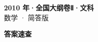\documentclass[zihao=-4, a4paper]{ctexart}
\begin{document}
\begin{center}
  {\Large\bfseries 2010 年·全国大纲卷Ⅱ·文科}\\[4pt]
  {\large 数学 · 简答版}
\end{center}
\medskip
{}

\clearpage
{}
\begin{center}{\Large\bfseries 答案速查}\end{center}
\medskip

\end{document}
